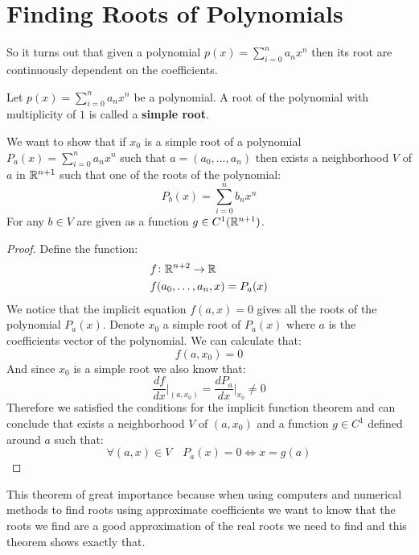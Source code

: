 \documentclass[11pt,a4paper]{article}
\begin{document}
	\section{Finding Roots of Polynomials}
	So it turns out that given a polynomial $p(x) = \sum_{i=0}^{n}{a_n x^n}$
	then its root are continuously dependent on the coefficients.
	\begin{definition}
		Let $p(x) = \sum_{i=0}^{n}{a_n x^n}$ be a polynomial. A root of the
		polynomial with multiplicity of $1$ is called a \textbf{simple root}.
	\end{definition}
	We want to show that if $x_0$ is a simple root of a polynomial 
	$P_a(x) = \sum_{i=0}^{n}{a_n x^n}$ such that $a = (a_0,\dots,a_n)$
	then exists a neighborhood $V$ of $a$ in $\mathbb{R}^{n+1}$ such that one of the
	roots of the polynomial:
	\[
		P_b(x) = \sum_{i=0}^{n}{b_n x^n}
	\]
	For any $b \in V$ are given as a function $g \in C^1(\mathbb{R}^{n+1})$.
	\begin{proof}
		Define the function:
		\begin{align*}
			&f \colon \mathbb{R}^{n + 2} \to \mathbb{R} \\
			&f(a_0,\dots,a_n,x) = P_a(x)
		\end{align*}
		We notice that the implicit equation $f(a,x) = 0$ gives all the roots
		of the polynomial $P_a(x)$. Denote $x_0$ a simple root of $P_a(x)$
		where $a$ is the coefficients vector of the polynomial. We
		can calculate that:
		\[
			f(a,x_0) = 0
		\]
		And since $x_0$ is a simple root we also know that:
		\[
			\frac{df}{dx}\biggr\vert_{(a,x_0)} = 
			\frac{dP_{a}}{dx}\biggr\vert_{x_0} \neq 0 
		\]
		Therefore we satisfied the conditions for the implicit function
		theorem and can conclude that exists a neighborhood $V$ of $(a,x_0)$
		and a function $g \in C^1$ defined around $a$ such that:
		\[
			\forall (a,x) \in V \quad P_a(x) = 0 \iff x = g(a)
		\]
	\end{proof}
	This theorem of great importance because when using computers and 
	numerical methods to find roots using approximate coefficients we want
	to know that the roots we find are a good approximation of the real
	roots we need to find and this theorem shows exactly that.
	
	\newpage
	
\end{document}
